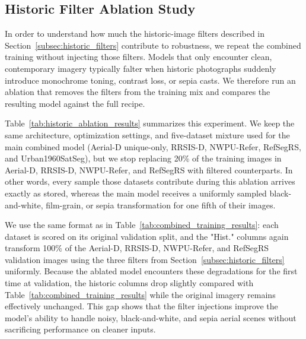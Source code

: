 \subsection{Historic Filter Ablation Study}
\label{subsec:historic_ablation}

In order to understand how much the historic-image filters described in Section~\ref{subsec:historic_filters} contribute to robustness, we repeat the combined training without injecting those filters. Models that only encounter clean, contemporary imagery typically falter when historic photographs suddenly introduce monochrome toning, contrast loss, or sepia casts. We therefore run an ablation that removes the filters from the training mix and compares the resulting model against the full recipe.

Table~\ref{tab:historic_ablation_results} summarizes this experiment. We keep the same architecture, optimization settings, and five-dataset mixture used for the main combined model (Aerial-D unique-only, RRSIS-D, NWPU-Refer, RefSegRS, and Urban1960SatSeg), but we stop replacing 20\% of the training images in Aerial-D, RRSIS-D, NWPU-Refer, and RefSegRS with filtered counterparts. In other words, every sample those datasets contribute during this ablation arrives exactly as stored, whereas the main model receives a uniformly sampled black-and-white, film-grain, or sepia transformation for one fifth of their images.

We use the same format as in Table~\ref{tab:combined_training_results}: each dataset is scored on its original validation split, and the "Hist." columns again transform 100\% of the Aerial-D, RRSIS-D, NWPU-Refer, and RefSegRS validation images using the three filters from Section~\ref{subsec:historic_filters} uniformly. Because the ablated model encounters these degradations for the first time at validation, the historic columns drop slightly compared with Table~\ref{tab:combined_training_results} while the original imagery remains effectively unchanged. This gap shows that the filter injections improve the model’s ability to handle noisy, black-and-white, and sepia aerial scenes without sacrificing performance on cleaner inputs.

